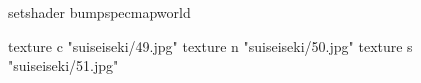 setshader bumpspecmapworld

    texture c "suiseiseki/49.jpg"
    texture n "suiseiseki/50.jpg"
    texture s "suiseiseki/51.jpg"
